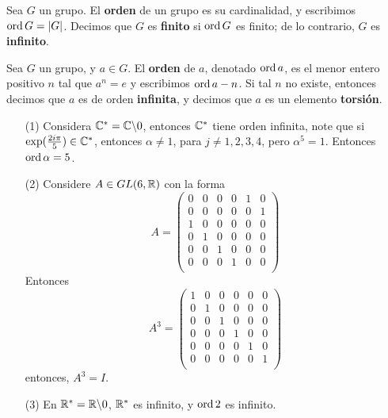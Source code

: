 \begin{definition}
    Sea $G$ un grupo. El \textbf{orden} de un grupo es su cardinalidad, y
    escribimos $\operatorname{ord}{G}=|G|$. Decimos que $G$ es  \textbf{finito} si $\operatorname{ord}{G}$
    es finito; de lo contrario, $G$ es  \textbf{infinito}.
\end{definition}

\begin{definition}
    Sea $G$ un grupo, y  $a \in G$. El  \textbf{orden} de $a$, denotado
    $\operatorname{ord}{a}$, es el menor entero positivo $n$ tal que  $a^n=e$ y escribimos
    $\operatorname{ord}{a}-n$. Si tal $n$ no existe, entonces decimos que $a$ es de orden
    \textbf{infinita}, y decimos que $a$ es un elemento  \textbf{torsi\'on}.
\end{definition}

\begin{example}\label{}
    \begin{enumerate}
        \item[(1)] Considera $\mathbb{C}^*=\mathbb{C}\backslash0$, entonces $\mathbb{C}^*$ tiene orden
            infinita, note que si $\exp(\frac{2i\pi}{5}) \in \mathbb{C}^*$, entonces
            $\alpha \neq 1$, para $j \neq 1,2,3,4$, pero $\alpha^5=1$. Entonces
             $\operatorname{ord}{\alpha}=5$.

         \item[(2)] Considere $A \in GL(6,\mathbb{R})$ con la forma
             \begin{equation*}
               A=\begin{pmatrix}
                     0 & 0 & 0 & 0 & 1 & 0 \\
                     0 & 0 & 0 & 0 & 0 & 1 \\
                     1 & 0 & 0 & 0 & 0 & 0 \\
                     0 & 1 & 0 & 0 & 0 & 0 \\
                     0 & 0 & 1 & 0 & 0 & 0 \\
                     0 & 0 & 0 & 1 & 0 & 0 \\
                 \end{pmatrix}
             \end{equation*}
            Entonces
             \begin{equation*}
               A^3=\begin{pmatrix}
                     1 & 0 & 0 & 0 & 0 & 0 \\
                     0 & 1 & 0 & 0 & 0 & 0 \\
                     0 & 0 & 1 & 0 & 0 & 0 \\
                     0 & 0 & 0 & 1 & 0 & 0 \\
                     0 & 0 & 0 & 0 & 1 & 0 \\
                     0 & 0 & 0 & 0 & 0 & 1 \\
                 \end{pmatrix}
             \end{equation*}
             entonces, $A^3=I$.

         \item[(3)] En $\mathbb{R}^*=\mathbb{R}\backslash0$, $\mathbb{R}^*$ es infinito, y  $\operatorname{ord}{2}$ es
             infinito.
    \end{enumerate}
\end{example}

